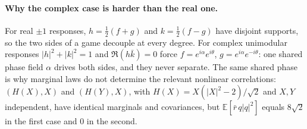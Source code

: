 \documentclass[11pt,a4paper]{article}
\newcommand{\E}{\mathbb{E}}
\begin{document}
\paragraph{Why the complex case is harder than the real one.} For real $\pm1$ responses, $h=\frac12(f+g)$ and
$k=\frac12(f-g)$ have disjoint supports, so the two sides of a game decouple at every degree. For complex unimodular
responses $|h|^2+|k|^2=1$ and $\Re(h\bar k)=0$ force $f=e^{i\alpha}e^{i\theta}$, $g=e^{i\alpha}e^{-i\theta}$: one shared
phase field $\alpha$ drives both sides, and they never separate. The same shared phase is why marginal laws do not
determine the relevant nonlinear correlations: $(H(X),X)$ and $(H(Y),X)$, with $H(X)=X(|X|^2-2)/\sqrt2$ and $X,Y$
independent, have identical marginals and covariances, but $\E[\bar r\,q|q|^2]$ equals $8\sqrt2$ in the first case and $0$
in the second.
\end{document}
